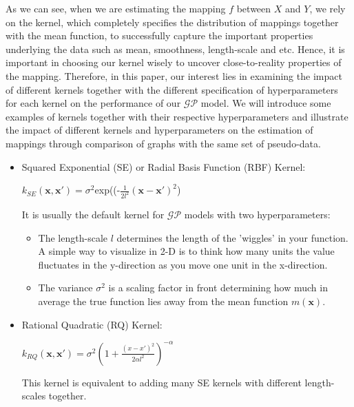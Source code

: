 \documentclass{article}
\begin{document}
As we can see, when we are estimating the mapping $f$ between $X$ and $Y$, we rely on the kernel, which completely specifies the distribution of mappings together with the mean function, to successfully capture the important properties underlying the data such as mean, smoothness, length-scale and etc. Hence, it is important in choosing our kernel wisely to uncover close-to-reality properties of the mapping. Therefore, in this paper, our interest lies in examining the impact of different kernels together with the different specification of hyperparameters for each kernel on the performance of our $\mathcal{GP}$ model. We will introduce some examples of kernels together with their respective hyperparameters and illustrate the impact of different kernels and hyperparameters on the estimation of mappings through comparison of graphs with the same set of pseudo-data.
\begin{itemize}
    \item Squared Exponential (SE) or Radial Basis Function (RBF) Kernel:\vspace{5mm}
    
    \centerline{$k_{SE}(\mathbf{x},\mathbf{x'}) = \sigma^2$exp((-$\frac{1}{2l^2}(\mathbf{x}-\mathbf{x'})^2$)}\vspace{5mm}
    
    It is usually the default kernel for $\mathcal{GP}$ models with two hyperparameters:
    \begin{itemize}
        \item The length-scale $l$ determines the length of the 'wiggles' in your function. A simple way to visualize in  2-D is to think how many units the value fluctuates in the y-direction as you move one unit in the x-direction.
        \item The variance $\sigma^2$ is a scaling factor in front determining how much in average the true function lies away from the mean function $m(\mathbf{x})$. 
    \end{itemize}\vspace{5mm}
    \item Rational Quadratic (RQ) Kernel: \vspace{5mm}\\
    \centerline{$k_{RQ}(\mathbf{x},\mathbf{x'}) = \sigma^2(1+\frac{(x-x')^2}{2\alpha l^2})^{-\alpha}$}
    This kernel is equivalent to adding many SE kernels with different length-scales together. 
\end{itemize}
\end{document}
